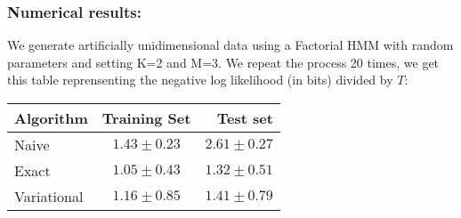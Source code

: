 \documentclass{beamer}
\begin{document}
    \begin{frame}
    \frametitle{Numerical results:}
    We generate artificially unidimensional data using a Factorial HMM with random parameters and setting K=2 and M=3. We repeat the process 20 times, we get this table reprensenting the negative log likelihood (in bits) divided by $T$:\\
    \center
    
    \begin{tabular}{|l|c|r|}
  \hline
  Algorithm & Training Set & Test set \\
  \hline
  Naive & $1.43\pm 0.23$ & $2.61\pm 0.27$ \\
  Exact & $1.05\pm 0.43$ & $1.32\pm 0.51$ \\
  Variational & $1.16\pm 0.85$ & $1.41\pm 0.79$ \\
  \hline
\end{tabular}
    \end{frame}
    
\end{document}
